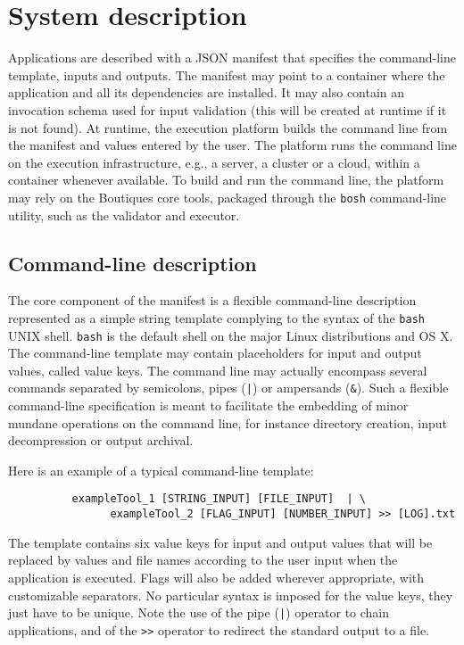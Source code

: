 \documentclass{article}
\newcommand{\note}[2]{\pdfmargincomment[color=yellow,author=#1,open=true]{#2}}
\newcommand{\boutiques}{Boutiques\xspace}
\begin{document}

\section{System description}
\label{sec:system}

Applications are described with a JSON manifest that specifies the
command-line template, inputs and outputs. The manifest may point to a
container where the application and all its dependencies are
installed. It may also contain an invocation schema used for input
validation (this will be created at runtime if it is not found). At
runtime, the execution platform builds the command line from the manifest
and values entered by the user. The platform runs the command line on the
execution infrastructure, e.g., a server, a cluster or a cloud, within a
container whenever available. To build and run the command line, the
platform may rely on the \boutiques core tools, packaged through the 
\texttt{bosh} command-line utility, such as the validator and executor.

\subsection{Command-line description}

The core component of the manifest is a flexible command-line
description represented as a simple string template complying to the
syntax of the \texttt{bash} UNIX shell. \texttt{bash} is the default
shell on the major Linux distributions and OS X. The command-line
template may contain placeholders for input and output values, called
value keys. The command line may actually encompass several commands
separated by semicolons, pipes (\texttt{|}) or ampersands (\texttt{\&}).
Such a flexible command-line specification is meant to facilitate the
embedding of minor mundane operations on the command line, for instance
directory creation, input decompression or output archival.

Here is an example of a typical command-line template:
\begin{verbatim}
          exampleTool_1 [STRING_INPUT] [FILE_INPUT]  | \
                exampleTool_2 [FLAG_INPUT] [NUMBER_INPUT] >> [LOG].txt
\end{verbatim}
The template contains six value keys for input and output values that
will be replaced by values and file names according to the user input
when the application is executed. Flags will also be added wherever
appropriate, with customizable separators. No particular syntax is
imposed for the value keys, they just have to be unique.  Note the use
of the pipe (\texttt{|}) operator to chain applications, and of the
\texttt{>>} operator to redirect the standard output to a file.
\end{document}
